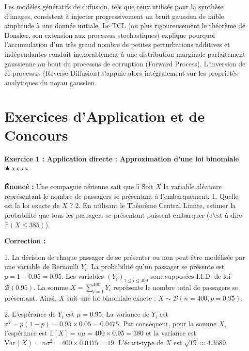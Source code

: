 \documentclass[11pt,a4paper]{article}
\begin{document}
Les modèles génératifs de diffusion, tels que ceux utilisés pour la synthèse d'images, consistent à injecter progressivement un bruit gaussien de faible amplitude à une donnée initiale.
Le TCL (ou plus rigoureusement le théorème de Donsker, son extension aux processus stochastiques) explique pourquoi l'accumulation d'un très grand nombre de petites perturbations additives et indépendantes conduit inexorablement à une distribution marginale parfaitement gaussienne au bout du processus de corruption (Forward Process). L'inversion de ce processus (Reverse Diffusion) s'appuie alors intégralement sur les propriétés analytiques du noyau gaussien.


\newpage
\part{Exercices d'Application et de Concours}

\subsection*{Exercice 1 : Application directe : Approximation d'une loi binomiale \quad $\bigstar\star\star\star\star$}

\textbf{Énoncé :}
Une compagnie aérienne sait que 5%
Soit $X$ la variable aléatoire représentant le nombre de passagers se présentant à l'embarquement.
1. Quelle est la loi exacte de $X$ ?
2. En utilisant le Théorème Central Limite, estimer la probabilité que tous les passagers se présentant puissent embarquer (c'est-à-dire $\mathbb{P}(X \le 385)$).

\textbf{Correction :}

1. La décision de chaque passager de se présenter ou non peut être modélisée par une variable de Bernoulli $Y_i$.
La probabilité qu'un passager se présente est $p = 1 - 0.05 = 0.95$.
Les variables $(Y_i)_{1 \le i \le 400}$ sont supposées I.I.D. de loi $\mathcal{B}(0.95)$.
La somme $X = \sum_{i=1}^{400} Y_i$ représente le nombre total de passagers se présentant.
Ainsi, $X$ suit une loi binomiale exacte : $X \sim \mathcal{B}(n=400, p=0.95)$.

2. L'espérance de $Y_i$ est $\mu = 0.95$.
La variance de $Y_i$ est $\sigma^2 = p(1-p) = 0.95 \times 0.05 = 0.0475$.
Par conséquent, pour la somme $X$, l'espérance est $\mathbb{E}[X] = n\mu = 400 \times 0.95 = 380$ et la variance est $\text{Var}(X) = n\sigma^2 = 400 \times 0.0475 = 19$.
L'écart-type de $X$ est $\sqrt{19} \approx 4.3589$.
\end{document}
